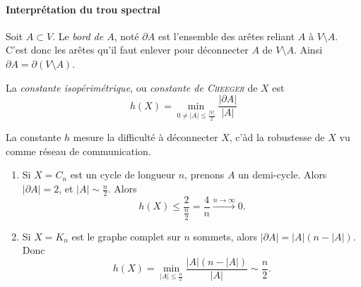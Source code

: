 \paragraph{Interprétation du trou spectral}

Soit $A \subset V$. Le \emph{bord de $A$}, noté $\partial A$ est l'ensemble des arêtes
reliant $A$ à $V \setminus A$. C'est donc les arêtes qu'il faut enlever pour déconnecter $A$ de $V \setminus
A$. Ainsi $\partial A = \partial (V \setminus A)$.

\begin{defi}
  La \emph{constante isopérimétrique}, ou \emph{constante de \textsc{Cheeger}} de $X$ est 
  \[ h(X) = \min_{0 \neq |A| \leq \frac{|V|}{2}} \frac{|\partial A|}{|A|} \]
\end{defi}

La constante $h$ mesure la difficulté à déconnecter $X$, c'àd la robustesse de $X$ vu comme réseau de
communication.

\begin{ex}
  \begin{enumerate}
  \item Si $X = C_n$ est un cycle de longueur $n$, prenons $A$ un demi-cycle. Alors $|\partial A| = 2$, et
    $|A| \sim \frac{n}{2}$. Alors 
    \[ h(X) \leq \frac{2}{\frac{n}{2}} = \frac{4}{n} \xrightarrow{n \to \infty} 0. \]
    
  \item Si $X = K_n$ est le graphe complet sur $n$ sommets, alors $|\partial A| = |A|(n - |A|)$. Donc 
    \[ h(X) = \min_{|A| \leq \frac{n}{2}} \frac{|A|(n - |A|)}{|A|} \sim \frac{n}{2}.  \]
  \end{enumerate}
\end{ex}























